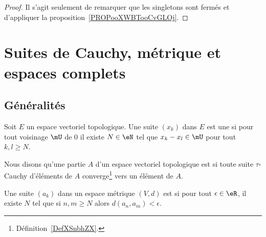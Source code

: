 \begin{proof}
	Il s'agit seulement de remarquer que les singletons sont fermés et d'appliquer la proposition~\ref{PROPooXWBTooCvGLOj}.
\end{proof}

\section{Suites de Cauchy, métrique et espaces complets}

\subsection{Généralités}

\begin{definition}   \label{DefZSnlbPc}
	Soit \( E\) un espace vectoriel topologique. Une suite \( (x_k)\) dans \( E\) est une  si pour tout voisinage \( \mU\) de \( 0\) il existe \( N\in \eN\) tel que \( x_k-x_l\in\mU\) pour tout \( k,l\geq N\).
\end{definition}

\begin{definition}      \label{DEFooVQDBooNxprFU}
	Nous disons qu'une partie \( A\) d'un espace vectoriel topologique est  si toute suite \(  \tau\)-Cauchy d'éléments de \( A\) converge\footnote{Définition~\ref{DefXSnbhZX}.} vers un élément de \( A\).
\end{definition}

\begin{definition}      \label{DEFooXOYSooSPTRTn}
	Une suite \( (a_k)\) dans un espace métrique \( (V,d)\) est  si pour tout \( \epsilon\in \eR\), il existe \( N\) tel que si \( n,m\geq N\) alors \( d(a_n,a_m)<\epsilon\).
\end{definition}

